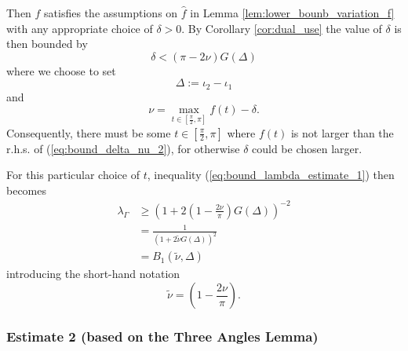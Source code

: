 \documentclass{article}
\begin{document}
Then $f$ satisfies the assumptions on $\hat f$ in Lemma \ref{lem:lower_bounb_variation_f} with any appropriate choice of $\delta > 0$.
By Corollary \ref{cor:dual_use} the value of $\delta$ is then bounded by
\begin{equation} \label{eq:bound_delta_nu_2}
    \delta < (\pi -2\nu)G(\Delta)
\end{equation}
where we choose to set
\begin{equation} \label{eq:def_of_Delta}
    \Delta := \iota_2-\iota_1    
\end{equation}
and
\[\nu = \max_{t\in[\frac\pi2,\pi]} f(t)-\delta.\]
Consequently, there must be some $t\in[\frac\pi2,\pi]$ where $f(t)$ is not larger than the r.h.s. of (\ref{eq:bound_delta_nu_2}), for otherwise $\delta$ could be chosen larger.

For this particular choice of $t$, inequality (\ref{eq:bound_lambda_estimate_1}) then becomes
\begin{align}
    \lambda_\Gamma &\ge \left(1 + 2\left(1 -\frac{2\nu}\pi\right)G(\Delta)\right)^{-2}\nonumber\\
    &= \frac{1}{\left(1 + 2\tilde\nu G(\Delta)\right)^{2}}\label{eq:lambda_estimate_1}\\
    &= B_1(\tilde\nu, \Delta) \nonumber
\end{align}
introducing the short-hand notation
\[\tilde\nu = \left(1 -\frac{2\nu}\pi\right).\]

\subsubsection*{Estimate 2 (based on the Three Angles Lemma)}
\end{document}
